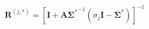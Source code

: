\begin{equation}
    \mathbf{R}^{(j,*)} = \left[\mathbf{I}+\mathbf{A}\boldsymbol{\Sigma^*}^{-1}(\sigma_j\mathbf{I}-\boldsymbol{\Sigma^*})\right]^{-1}
\label{eq:emt_r_ellipsoids}
\end{equation}
